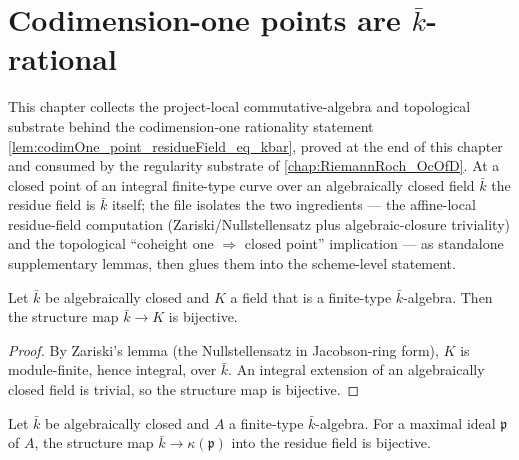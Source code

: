 \chapter{Codimension-one points are \texorpdfstring{$\bar k$}{kbar}-rational}
\label{chap:RiemannRoch_ResidueFieldKbar}


\providecommand{\Order}{\mathrm{Order}}
\providecommand{\krullDim}{\dim}
\providecommand{\coheight}{\operatorname{coheight}}
\providecommand{\height}{\operatorname{ht}}

This chapter collects the project-local commutative-algebra and topological
substrate behind the codimension-one rationality statement
\cref{lem:codimOne_point_residueField_eq_kbar}, proved at the end of this
chapter and consumed by the regularity substrate of
\cref{chap:RiemannRoch_OcOfD}.  At a closed point of an integral finite-type
curve over an algebraically closed field $\bar k$ the residue field is $\bar k$
itself; the file isolates the two ingredients --- the affine-local residue-field
computation (Zariski/Nullstellensatz plus algebraic-closure triviality) and the
topological ``coheight one $\Rightarrow$ closed point'' implication --- as
standalone supplementary lemmas, then glues them into the scheme-level statement.

\begin{lemma}
  \label{lem:algebraMap_bijective_of_finiteType}
  \leanok
  Let $\bar k$ be algebraically closed and $K$ a field that is a finite-type
  $\bar k$-algebra.  Then the structure map $\bar k \to K$ is bijective.
\end{lemma}

\begin{proof}\leanok
  By Zariski's lemma (the Nullstellensatz in Jacobson-ring form), $K$ is
  module-finite, hence integral, over $\bar k$.  An integral extension of
  an algebraically closed field is trivial, so the structure map is bijective.
\end{proof}

\begin{lemma}
  \label{lem:algebraMap_residueField_bijective_of_isMaximal}
  \leanok
  Let $\bar k$ be algebraically closed and $A$ a finite-type $\bar k$-algebra.
  For a maximal ideal $\mathfrak p$ of $A$, the structure map
  $\bar k \to \kappa(\mathfrak p)$ into the residue field is bijective.
\end{lemma}

